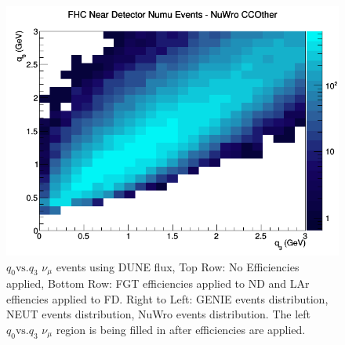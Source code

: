 \documentclass[12pt]{article}
\begin{document}
\begin{figure}[h]
\endminipage
{}
\includegraphics[width=\linewidth]{eff_q0_q3/FGT/CCOther_FHC_ND_numu_q3_q0_NuWro.png}
\endminipage
\caption{$q_0 \textrm{vs.} q_3$ $\nu_{\mu}$ events using DUNE flux, Top Row: No Efficiencies applied, Bottom Row: FGT efficiencies applied to ND and LAr effiencies applied to FD. Right to Left: GENIE events distribution, NEUT events distribution, NuWro events distribution. The left $q_0 \textrm{vs.} q_3$ $\nu_{\mu}$ region is being filled in after efficiencies are applied.}
\label{fig:q0q3_numu_CCOther_events}
\end{figure}
\end{document}
